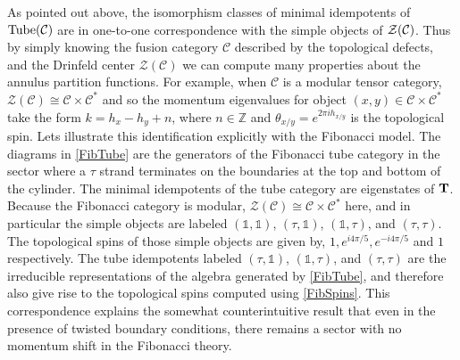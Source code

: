 As pointed out above, the isomorphism classes of minimal idempotents of $\operatorname{Tube}(\mathcal{C})$ are in one-to-one correspondence with the simple objects of $\mathcal{Z}(\mathcal{C})$.
Thus by simply knowing the fusion category $\mathcal{C}$ described by the topological defects, 
and the Drinfeld center $\mathcal{Z}(\mathcal{C})$ we can compute many properties about the annulus partition functions. 
For example, when $\mathcal{C}$ is a modular tensor category, $\mathcal{Z}(\mathcal{C}) \cong \mathcal{C} \times \mathcal{C}^*$ and so the momentum eigenvalues for object $(x,y) \in \mathcal{C} \times \mathcal{C}^*$ take the form $k= h_x-h_y + n$, where $n \in \mathbb{Z}$ and $\theta_{x/y} = e^{2\pi i h_{x/y}}$ is the topological spin.
Lets illustrate this identification explicitly with the Fibonacci model. 
The diagrams in \eqref{FibTube} are the generators of the Fibonacci tube category in the sector where a $\tau$ strand terminates on the boundaries at the top and bottom of the cylinder. The minimal idempotents of the tube category are eigenstates of ${\mathbf{T}}$. 
Because the Fibonacci category is modular, $\mathcal{Z}(\mathcal{C}) \cong \mathcal{C} \times \mathcal{C}^*$ here, and in particular the simple objects are labeled $(\mathds{1}, \mathds{1})$, $(\tau, \mathds{1})$, $(\mathds{1}, \tau)$, and $(\tau, \tau)$.
The topological spins of those simple objects are given by, $1, e^{i 4 \pi /5}, e^{-i 4 \pi /5}$ and $1$ respectively. 
The tube idempotents labeled $(\tau, \mathds{1})$, $(\mathds{1}, \tau)$, and $(\tau, \tau)$ are the irreducible representations of the algebra generated by \eqref{FibTube}, and therefore also give rise to the topological spins computed using \eqref{FibSpins}.  
This correspondence explains the somewhat counterintuitive result that even in the presence of twisted boundary conditions, there remains a sector with no momentum shift in the Fibonacci theory.



